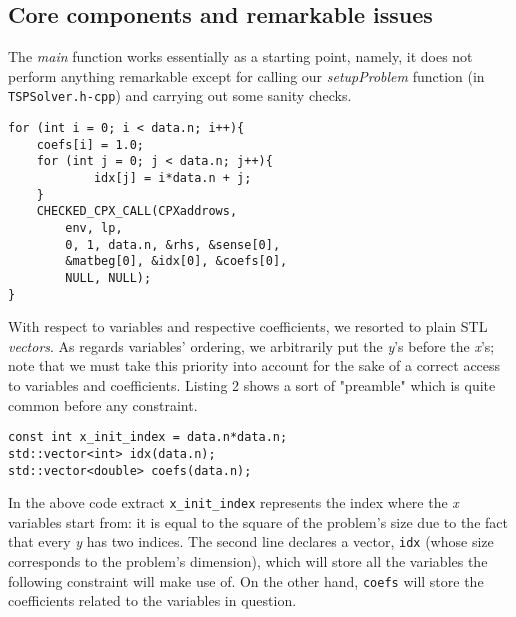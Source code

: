 \documentclass[letterpaper, 10 pt, conference]{ieeeconf}  %
\begin{document}
\subsection{Core components and remarkable issues}
The \textit{main} function works essentially as a starting point, namely, it does not perform anything remarkable except for calling our \textit{setupProblem} function (in \texttt{TSPSolver.h-cpp}) and carrying out some sanity checks.
\lstset{language=C++,
  basicstyle=\ttfamily,
}
\begin{lstlisting}[caption={Visit constraint}]
for (int i = 0; i < data.n; i++){
	coefs[i] = 1.0;
	for (int j = 0; j < data.n; j++){
            idx[j] = i*data.n + j;
	}
	CHECKED_CPX_CALL(CPXaddrows,
        env, lp, 
        0, 1, data.n, &rhs, &sense[0], 
        &matbeg[0], &idx[0], &coefs[0],
        NULL, NULL);
}
\end{lstlisting} 
With respect to variables and respective coefficients, we resorted to plain STL 
\textit{vectors}. As regards variables' ordering, we arbitrarily put the \textit{y}'s before the \textit{x}'s; note that we must take this priority into account for the sake of a correct access to variables and coefficients. Listing 2
shows a sort of "preamble" which is quite common before any constraint.
\begin{lstlisting}[caption={Important data structure declarations}]
const int x_init_index = data.n*data.n;
std::vector<int> idx(data.n);
std::vector<double> coefs(data.n);
\end{lstlisting}
In the above code extract \texttt{x\_init\_index} represents the index where
the \textit{x} variables start from: it is equal to the square of the problem's size due to the fact that every \textit{y} has two indices. The second line declares a vector, \texttt{idx} (whose size corresponds to the problem's dimension), which will store all the variables the following constraint will make use of. On the other hand, \texttt{coefs} will store the coefficients related to the variables in question.
\end{document}
